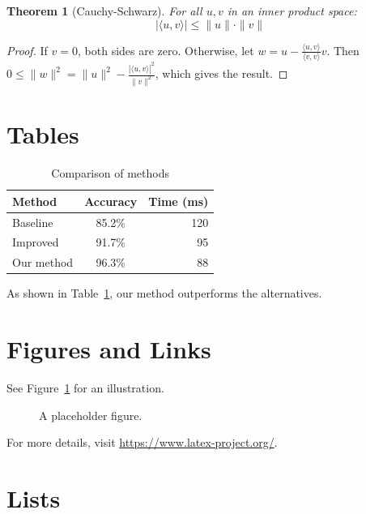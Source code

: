 \documentclass[12pt,a4paper]{article}
\newtheorem{theorem}{Theorem}[section]
\theoremstyle{definition}
\begin{document}
\begin{theorem}[Cauchy-Schwarz]
	For all $u, v$ in an inner product space:
	\[ |\langle u, v \rangle| \leq \|u\| \cdot \|v\| \]
\end{theorem}

\begin{proof}
	If $v = 0$, both sides are zero. Otherwise, let $w = u - \frac{\langle u, v \rangle}{\langle v, v \rangle} v$.
	Then $0 \leq \|w\|^2 = \|u\|^2 - \frac{|\langle u, v \rangle|^2}{\|v\|^2}$,
	which gives the result.
\end{proof}

\section{Tables}

\begin{table}[h]
	\centering
	\caption{Comparison of methods}
	\label{tab:methods}
	\begin{tabular}{@{} l c r @{}}
		\toprule
		Method     & Accuracy & Time (ms) \\
		\midrule
		Baseline   & 85.2\%   & 120       \\
		Improved   & 91.7\%   & 95        \\
		Our method & 96.3\%   & 88        \\
		\bottomrule
	\end{tabular}
\end{table}

As shown in Table~\ref{tab:methods}, our method outperforms the alternatives.

\section{Figures and Links}

See Figure~\ref{fig:placeholder} for an illustration.

\begin{figure}[h]
	\centering
	\caption{A placeholder figure.}
	\label{fig:placeholder}
\end{figure}

For more details, visit \url{https://www.latex-project.org/}.

\section{Lists}
\end{document}
